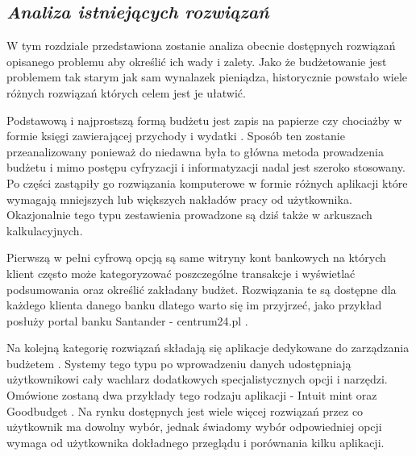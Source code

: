 \documentclass[a4paper,10pt, twoside]{report}
\newcommand{\customstylechapter}[1]{\large{\textit{#1}}}
\begin{document}
\begin{large}
\chapter{\customstylechapter{Analiza istniejących rozwiązań}}
{W tym rozdziale przedstawiona zostanie analiza obecnie dostępnych rozwiązań 
opisanego problemu aby określić ich wady i zalety. Jako że budżetowanie jest 
problemem tak starym jak sam wynalazek pieniądza, historycznie powstało wiele 
różnych rozwiązań których celem jest je ułatwić.}

{Podstawową i najprostszą formą budżetu jest zapis na papierze czy chociażby w 
formie księgi zawierającej przychody i wydatki \cite{o24_budzetowanie}. Sposób ten zostanie 
przeanalizowany ponieważ do niedawna była to główna metoda prowadzenia budżetu 
i mimo postępu cyfryzacji i informatyzacji nadal jest szeroko stosowany. Po 
części zastąpiły go rozwiązania komputerowe w formie różnych aplikacji które 
wymagają mniejszych lub większych nakładów pracy od użytkownika. Okazjonalnie 
tego typu zestawienia prowadzone są dziś także w arkuszach kalkulacyjnych.}

{Pierwszą w pełni cyfrową opcją są same witryny kont bankowych \cite{ingbudżet} 
na których klient często może kategoryzować poszczególne transakcje i wyświetlać
 podsumowania oraz określić zakładany budżet. Rozwiązania te są dostępne dla 
każdego klienta danego banku dlatego warto się im przyjrzeć, jako przykład 
posłuży portal banku Santander - centrum24.pl \cite{santandercentrum24}.}

{Na kolejną kategorię rozwiązań składają się aplikacje dedykowane do zarządzania
 budżetem \cite{budget}. Systemy tego typu po wprowadzeniu danych udostępniają 
użytkownikowi cały wachlarz dodatkowych specjalistycznych opcji i narzędzi. 
Omówione zostaną dwa przykłady tego rodzaju aplikacji - Intuit mint \cite{mint} 
oraz Goodbudget \cite{goodbudget}. Na rynku dostępnych jest wiele więcej 
rozwiązań przez co użytkownik ma dowolny wybór, jednak świadomy wybór 
odpowiedniej opcji wymaga od użytkownika dokładnego przeglądu i porównania kilku
 aplikacji.}



\end{large}
\end{document}

